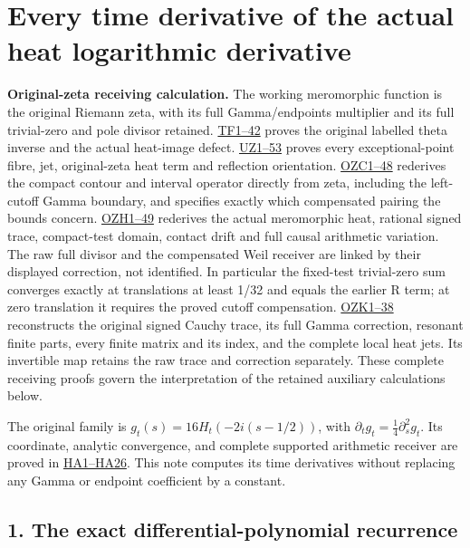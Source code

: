\documentclass[
  10pt,
  a4paper,
]{article}
\author{}
\date{}
\begin{document}
{
\setcounter{tocdepth}{3}
\tableofcontents
}
\section{Every time derivative of the actual heat logarithmic
derivative}\label{every-time-derivative-of-the-actual-heat-logarithmic-derivative}

\textbf{Original-zeta receiving calculation.} The working meromorphic
function is the original Riemann zeta, with its full Gamma/endpoints
multiplier and its full trivial-zero and pole divisor retained.
\href{FAITHFUL_THETA_COMPLETION_RETURN.md}{TF1--42} proves the original
labelled theta inverse and the actual heat-image defect.
\href{FAITHFUL_UNCOMPLETED_ZETA_HEAT.md}{UZ1--53} proves every
exceptional-point fibre, jet, original-zeta heat term and reflection
orientation.
\href{ORIGINAL_ZETA_COMPACT_WEIL_RECONSTRUCTION.md}{OZC1--48} rederives
the compact contour and interval operator directly from zeta, including
the left-cutoff Gamma boundary, and specifies exactly which compensated
pairing the bounds concern.
\href{ORIGINAL_ZETA_HEAT_CONTACT_RECONSTRUCTION.md}{OZH1--49} rederives
the actual meromorphic heat, rational signed trace, compact-test domain,
contact drift and full causal arithmetic variation. The raw full divisor
and the compensated Weil receiver are linked by their displayed
correction, not identified. In particular the fixed-test trivial-zero
sum converges exactly at translations at least 1/32 and equals the
earlier R term; at zero translation it requires the proved cutoff
compensation. \href{ORIGINAL_ZETA_CAUCHY_RECONSTRUCTION.md}{OZK1--38}
reconstructs the original signed Cauchy trace, its full Gamma
correction, resonant finite parts, every finite matrix and its index,
and the complete local heat jets. Its invertible map retains the raw
trace and correction separately. These complete receiving proofs govern
the interpretation of the retained auxiliary calculations below.

The original family is \(g_t(s)=16H_t(-2i(s-1/2))\), with
\(\partial_tg_t=\tfrac14\partial_s^2g_t\). Its coordinate, analytic
convergence, and complete supported arithmetic receiver are proved in
\href{HEAT_CAUCHY_ARITHMETIC_DERIVATION.md}{HA1--HA26}. This note
computes its time derivatives without replacing any Gamma or endpoint
coefficient by a constant.

\subsection{1. The exact differential-polynomial
recurrence}\label{the-exact-differential-polynomial-recurrence}
\end{document}
